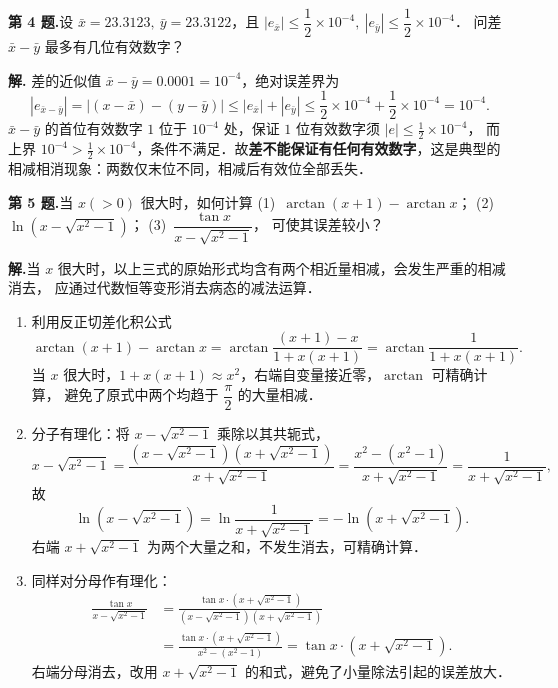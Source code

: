\documentclass[UTF8,a4paper,11pt]{ctexart}
\begin{document}
\bigskip\bigskip

\noindent\textbf{第 4 题.}\quad 设 $\bar{x}=23.3123,\ \bar{y}=23.3122$，且
$|e_{\bar{x}}|\leqslant\dfrac{1}{2}\times 10^{-4},\ |e_{\bar{y}}|\leqslant\dfrac{1}{2}\times 10^{-4}$．
问差 $\bar{x}-\bar{y}$ 最多有几位有效数字？

\medskip
\noindent\textbf{解.}\quad
差的近似值 $\bar{x}-\bar{y}=0.0001=10^{-4}$，绝对误差界为
\[
  |e_{\bar{x}-\bar{y}}|
  = \bigl|(x-\bar{x})-(y-\bar{y})\bigr|
  \leqslant |e_{\bar{x}}|+|e_{\bar{y}}|
  \leqslant \frac{1}{2}\times 10^{-4}+\frac{1}{2}\times 10^{-4} = 10^{-4}.
\]
$\bar{x}-\bar{y}$ 的首位有效数字 $1$ 位于 $10^{-4}$ 处，保证 $1$ 位有效数字须 $|e|\leqslant\frac{1}{2}\times 10^{-4}$，
而上界 $10^{-4}>\frac{1}{2}\times 10^{-4}$，条件不满足．故\textbf{差不能保证有任何有效数字}，这是典型的相减相消现象：两数仅末位不同，相减后有效位全部丢失．

\bigskip\bigskip

\noindent\textbf{第 5 题.}\quad 当 $x(>0)$ 很大时，如何计算
(1)~$\arctan(x+1)-\arctan x$；\quad
(2)~$\ln(x-\sqrt{x^2-1})$；\quad
(3)~$\dfrac{\tan x}{x-\sqrt{x^2-1}}$，
可使其误差较小？

\medskip
\noindent\textbf{解.}\quad 当 $x$ 很大时，以上三式的原始形式均含有两个相近量相减，会发生严重的相减消去，
应通过代数恒等变形消去病态的减法运算．

\begin{enumerate}[label=(\arabic*),leftmargin=*,itemsep=6pt]
  \item 利用反正切差化积公式
        \[
          \arctan(x+1)-\arctan x
          = \arctan\frac{(x+1)-x}{1+x(x+1)}
          = \arctan\frac{1}{1+x(x+1)}.
        \]
        当 $x$ 很大时，$1+x(x+1)\approx x^2$，右端自变量接近零，$\arctan$ 可精确计算，
        避免了原式中两个均趋于 $\dfrac{\pi}{2}$ 的大量相减．

  \item 分子有理化：将 $x-\sqrt{x^2-1}$ 乘除以其共轭式，
        \[
          x-\sqrt{x^2-1}
          = \frac{(x-\sqrt{x^2-1})(x+\sqrt{x^2-1})}{x+\sqrt{x^2-1}}
          = \frac{x^2-(x^2-1)}{x+\sqrt{x^2-1}}
          = \frac{1}{x+\sqrt{x^2-1}},
        \]
        故
        \[
          \ln(x-\sqrt{x^2-1}) = \ln\frac{1}{x+\sqrt{x^2-1}} = -\ln(x+\sqrt{x^2-1}).
        \]
        右端 $x+\sqrt{x^2-1}$ 为两个大量之和，不发生消去，可精确计算．

  \item 同样对分母作有理化：
        \begin{align*}
          \frac{\tan x}{x-\sqrt{x^2-1}}
          &= \frac{\tan x \cdot (x+\sqrt{x^2-1})}{(x-\sqrt{x^2-1})(x+\sqrt{x^2-1})} \\
          &= \frac{\tan x \cdot (x+\sqrt{x^2-1})}{x^2-(x^2-1)}
           = \tan x\cdot(x+\sqrt{x^2-1}).
        \end{align*}
        右端分母消去，改用 $x+\sqrt{x^2-1}$ 的和式，避免了小量除法引起的误差放大．
\end{enumerate}
\end{document}
